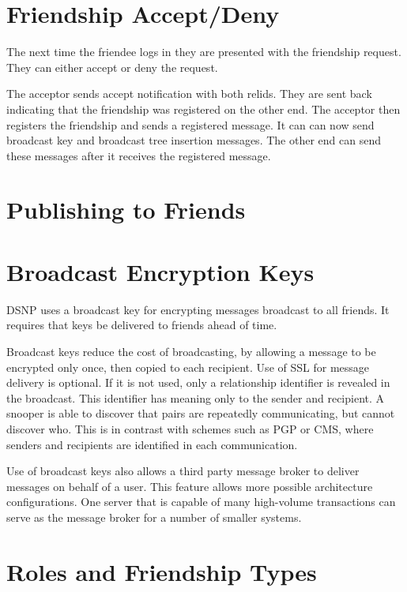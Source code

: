 \documentclass[letterpaper,11pt,oneside]{article}
\begin{document}
\section{Friendship Accept/Deny}

The next time the friendee logs in they are presented with the friendship
request. They can either accept or deny the request. 

The acceptor sends accept notification with both relids. They are sent back
indicating that the friendship was registered on the other end. The acceptor
then registers the friendship and sends a registered message. It can can now
send broadcast key and broadcast tree insertion messages. The other end can
send these messages after it receives the registered message.

\section{Publishing to Friends}

\section{Broadcast Encryption Keys}

DSNP uses a broadcast key for encrypting messages broadcast to all friends.
It requires that keys be delivered to friends ahead of time.

Broadcast keys reduce the cost of broadcasting, by allowing a message to be
encrypted only once, then copied to each recipient. Use of SSL for message
delivery is optional. If it is not used, only a relationship identifier is
revealed in the broadcast. This identifier has meaning only to the sender and
recipient. A snooper is able to discover that pairs are repeatedly
communicating, but cannot discover who. This is in contrast with schemes such
as PGP or CMS, where senders and recipients are identified in each
communication.

Use of broadcast keys also allows a third party message broker to deliver
messages on behalf of a user. This feature allows more possible architecture
configurations. One server that is capable of many high-volume transactions can
serve as the message broker for a number of smaller systems.

\section{Roles and Friendship Types}
\end{document}
